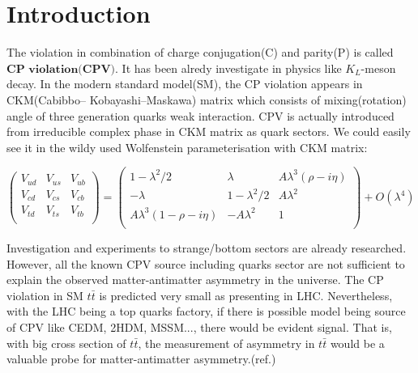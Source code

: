 

\section{Introduction}
\label{sec:Introduction}

	The violation in combination of charge conjugation(C) and parity(P) is called $\textbf{CP}$ $\textbf{violation}$$\textbf{(CPV)}$. It has been alredy investigate in physics like $K_L$-meson decay. In the modern standard model(SM), the CP violation appears in CKM(Cabibbo– Kobayashi–Maskawa) matrix which consists of mixing(rotation) angle of three generation quarks weak interaction. CPV is actually introduced from irreducible complex phase in CKM matrix as quark sectors. We could easily see it in the wildy used Wolfenstein parameterisation with CKM matrix:

	\begin{equation}
  		\begin{pmatrix}
  		V_{ud} & V_{us} & V_{ub} \\
  		V_{cd} & V_{cs} & V_{cb} \\
  		V_{td} & V_{ts} & V_{tb} \\
  		\end{pmatrix}
  		=
  		\begin{pmatrix}
  		1 - \lambda^2/2 & \lambda & A \lambda^3(\rho -i \eta) \\
  		-\lambda & 1 - \lambda^2/2 & A \lambda^2 \\
  		A \lambda^3(1 - \rho -i \eta) & - A \lambda^2 & 1 \\
  		\end{pmatrix} 
  		+ O(\lambda^4)
	\end{equation}

	Investigation and experiments to strange/bottom sectors are already researched. However, all the known CPV source including quarks sector are not sufficient to explain the observed matter-antimatter asymmetry in the universe. The CP violation in SM $t\bar{t}$ is predicted very small as presenting in LHC. Nevertheless, with the LHC being a top quarks factory, if there is possible model being source of CPV like CEDM, 2HDM, MSSM..., there would be evident signal. That is, with big cross section of $t\bar{t}$, the measurement of asymmetry in $t\bar{t}$ would be a valuable probe for matter-antimatter asymmetry.(ref.\cite{Olive_2014})

